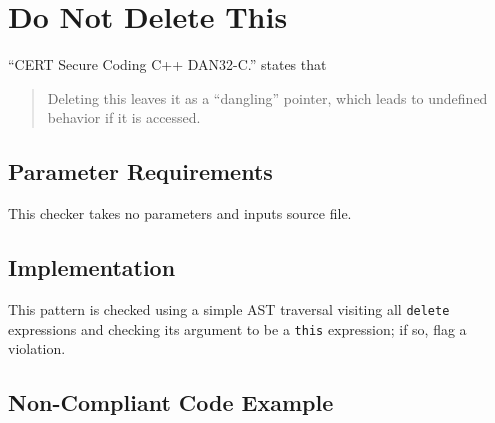 %
%

\section{Do Not Delete This}
\label{DoNotDeleteThis::overview}
``CERT Secure Coding C++ DAN32-C.'' states that
\begin{quote}
Deleting this leaves it as a ``dangling'' pointer, which leads to undefined behavior if it is accessed.
\end{quote}

\subsection{Parameter Requirements}
This checker takes no parameters and inputs source file.

\subsection{Implementation}
This pattern is checked using a simple AST traversal visiting all {\tt delete} expressions and checking its argument to be a {\tt this} expression; if so, flag a violation.

\subsection{Non-Compliant Code Example}

